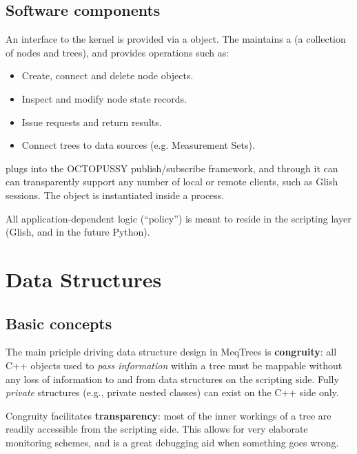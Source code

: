 \section{Software components}

  An interface to the kernel is provided via a  object. The
   maintains a  (a collection of nodes and trees), and
  provides operations such as:

  \begin{itemize}

  \item Create, connect and delete node objects.

  \item Inspect and modify node state records.

  \item Issue requests and return results.

  \item Connect trees to data sources (e.g. Measurement Sets).

  \end{itemize}

   plugs into the OCTOPUSSY publish/subscribe framework, and
  through it can can transparently support any number of local or remote
  clients, such as Glish sessions. The  object is instantiated
  inside a  process.

  All application-dependent logic (``policy'') is meant to reside in the scripting
  layer (Glish, and in the future Python).

\chapter{Data Structures} 

\section{Basic concepts}

  The main priciple driving data structure design in MeqTrees is {\bf
  congruity}: all C++ objects used to {\em pass information} within a tree must
  be mappable without any loss of information to and from data structures on
  the scripting side. Fully {\em private} structures (e.g., private nested
  classes) can exist on the C++ side only.

  Congruity facilitates {\bf transparency}: most of the inner workings of a
  tree are readily accessible from the scripting side. This allows for very
  elaborate monitoring schemes, and is a great debugging aid when something
  goes wrong.


